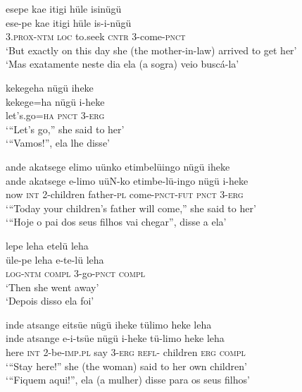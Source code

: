 \documentclass[output=paper,
modfonts,nonflat
]{langsci/langscibook}
\begin{document}
\ea esepe kae itigi hüle isinügü \\[.3em]
\gll ese-pe		kae	itigi	hüle	is-i-nügü \\
\textsc{3.prox-ntm} 	\textsc{loc} 	to.seek	\textsc{cntr} 	3-come-\textsc{pnct} \\
\glt ‘But exactly on this day she (the mother-in-law) arrived to get her’ \\
‘Mas exatamente neste dia ela (a sogra) veio buscá-la’ \\
\z

\ea kekegeha nügü iheke \\[.3em]
\gll kekege=ha	nügü	i-heke \\
let’s.go=\textsc{ha}	\textsc{pnct}	3-\textsc{erg} \\
\glt ‘“Let’s go,” she said to her’ \\
‘“Vamos!”, ela lhe disse’ \\
\z

\ea ande akatsege elimo uünko etimbelüingo nügü iheke \\
\gll ande	akatsege	e-limo		uüN-ko	etimbe-lü-ingo	nügü	i-heke \\
now	\textsc{int}		2-children	father-\textsc{pl}	come-\textsc{pnct-fut} 	\textsc{pnct} 	3-\textsc{erg} \\
\glt ‘“Today your children’s father will come,” she said to her’ \\
‘“Hoje o pai dos seus filhos vai chegar”, disse a ela’ \\
\z

\ea lepe leha etelü leha \\[.3em]
\gll üle-pe		leha	e-te-lü		leha \\
\textsc{log-ntm}	\textsc{compl} 3-go-\textsc{pnct}	\textsc{compl} \\
\glt ‘Then she went away’ \\
‘Depois disso ela foi’ \\
\z

\ea inde atsange eitsüe nügü iheke tülimo heke leha \\[.3em]
\gll inde	atsange	e-i-tsüe	nügü	i-heke	tü-limo	heke	leha \\
here 	\textsc{int}		2-be-\textsc{imp.pl} 	say 	3-\textsc{erg}	\textsc{refl}- children \textsc{erg} 	\textsc{compl} \\ 
\glt ‘“Stay here!” she (the woman) said to her own children’ \\
‘“Fiquem aqui!”, ela (a mulher) disse para os seus filhos’ \\
\z
\end{document}
